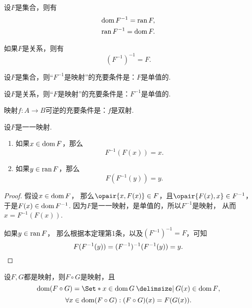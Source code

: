 \begin{theorem}
设\(F\)是集合，则有\begin{gather}
	\operatorname{dom} F^{-1} = \operatorname{ran} F, \\
	\operatorname{ran} F^{-1} = \operatorname{dom} F.
\end{gather}

如果\(F\)是关系，则有\begin{equation}
	(F^{-1})^{-1} = F.
\end{equation}
\end{theorem}

\begin{theorem}
设\(F\)是集合，则“\(F^{-1}\)是映射”的充要条件是：\(F\)是单值的.

设\(F\)是关系，则“\(F\)是映射”的充要条件是：\(F^{-1}\)是单值的.
\end{theorem}

\begin{theorem}\label{theorem:集合论.映射可逆的充要条件}
映射\(f\colon A \to B\)可逆的充要条件是：\(f\)是双射.
\end{theorem}

\begin{theorem}
设\(F\)是一一映射.
\begin{enumerate}
	\item 如果\(x \in \operatorname{dom} F\)，那么\[
		F^{-1}(F(x)) = x.
	\]

	\item 如果\(y \in \operatorname{ran} F\)，那么\[
		F(F^{-1}(y)) = y.
	\]
\end{enumerate}
\begin{proof}
假设\(x \in \operatorname{dom} F\)，
那么\(\opair{x,F(x)} \in F\)，且\(\opair{F(x),x} \in F^{-1}\)，
于是\(F(x) \in \operatorname{dom} F^{-1}\).
因为\(F\)是一一映射，是单值的，所以\(F^{-1}\)是映射，
从而\(x = F^{-1}(F(x))\).

如果\(y \in \operatorname{ran} F\)，
那么根据本定理第1条，以及\((F^{-1})^{-1} = F\)，可知\[
	F(F^{-1}(y)) = (F^{-1})^{-1}(F^{-1}(y)) = y.
	\qedhere
\]
\end{proof}
\end{theorem}

\begin{theorem}
设\(F,G\)都是映射，则\(F \circ G\)是映射，且\[
	\dom(F \circ G)
	= \Set*{ x \in \dom G \given G(x) \in \dom F },
\]\[
	\forall x \in \operatorname{dom}(F \circ G):
	(F \circ G)(x) = F(G(x)).
\]
\end{theorem}

